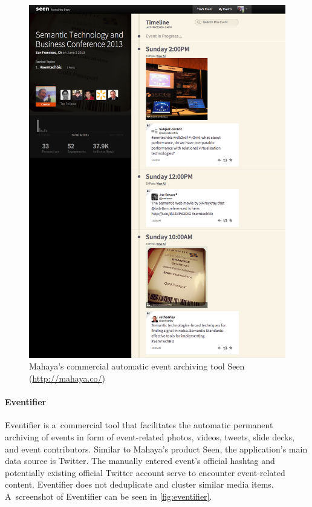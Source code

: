 \begin{figure}
  \centering
  \includegraphics[width=\linewidth]{seen.png}
  \caption{Mahaya's commercial automatic event archiving tool Seen
    (\url{http://mahaya.co/})}
  \label{fig:seen}
\end{figure}

\paragraph{Eventifier}

Eventifier is a~commercial tool that facilitates the automatic permanent archiving of events
in form of event-related photos, videos, tweets, slide decks, 
and event contributors.
Similar to Mahaya's product Seen,
the application's main data source is Twitter.
The manually entered event's official hashtag and potentially existing
official Twitter account serve to encounter event-related content.
Eventifier does not deduplicate and cluster
similar media items.
A~screenshot of Eventifier can be seen in \autoref{fig:eventifier}.

